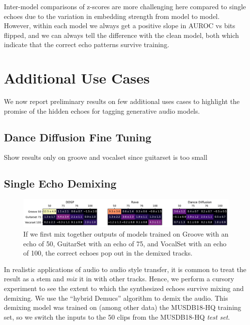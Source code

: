 \documentclass[letterpaper]{article} %
\begin{document}
Inter-model comparisons of z-scores are more challenging here compared to single echoes due to the variation in embedding strength from model to model.   However, within each model we always get a positive slope in AUROC vs bits flipped, and we can always tell the difference with the clean model, both which indicate that the correct echo patterns survive training.


\section{Additional Use Cases}

We now report preliminary results on few additional uses cases to highlight the promise of the hidden echoes for tagging generative audio models.



\subsection{Dance Diffusion Fine Tuning}

Show results only on groove and vocalset since guitarset is too small


\subsection{Single Echo Demixing}

\begin{figure}
    \centering
    \includegraphics[width=\textwidth]{figs/DemucsZScores.pdf}
    \caption{If we first mix together outputs of models trained on Groove with an echo of 50, GuitarSet with an echo of 75, and VocalSet with an echo of 100, the correct echoes pop out in the demixed tracks.}
    \label{fig:demucszscores}
\end{figure}

In realistic applications of audio to audio style transfer, it is common to treat the result as a stem and {\em mix} it in with other tracks.  Hence, we perform a cursory experiment to see the extent to which the synthesized echoes survive mixing and demixing.  We use the ``hybrid Demucs'' algorithm \cite{defossez2019music} to demix the audio.  This demixing model was trained on (among other data) the MUSDB18-HQ training set, so we switch the inputs to the 50 clips from the MUSDB18-HQ {\em test set}.  
\end{document}
